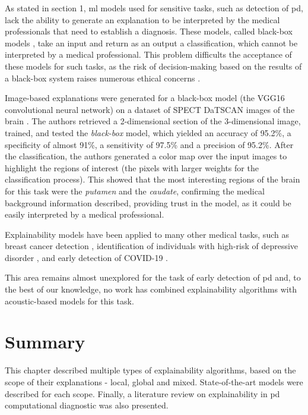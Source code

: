 As stated in section 1, \gls{ml} models used for sensitive tasks, such as detection of \gls{pd}, lack the ability to generate an explanation to be interpreted by the medical professionals that need to establish a diagnosis. These models, called black-box models \cite{explainable_ai_systems}, take an input and return as an output a classification, which cannot be interpreted by a medical professional. This problem difficults the acceptance of these models for such tasks, as the risk of decision-making based on the results of a black-box system raises numerous ethical concerns \cite{ethical_black_box_decision}.

Image-based explanations were generated for a black-box model (the VGG16 convolutional neural network) on a dataset of SPECT DaTSCAN images of the brain \cite{LIME_explainability}. The authors retrieved a 2-dimensional section of the 3-dimensional image, trained, and tested the \textit{black-box} model, which yielded an accuracy of 95.2\%, a specificity of almost 91\%, a sensitivity of 97.5\% and a precision of 95.2\%. After the classification, the authors generated a color map over the input images to highlight the regions of interest (the pixels with larger weights for the classification process). This showed that the most interesting regions of the brain for this task were the \textit{putamen} and the \textit{caudate}, confirming the medical background information described, providing trust in the model, as it could be easily interpreted by a medical professional.

Explainability models have been applied to many other medical tasks, such as breast cancer detection \cite{lime_breast_cancer}, identification of individuals with high-risk of depressive disorder \cite{lime_depression}, and early detection of COVID-19 \cite{lime_covid}. 

This area remains almost unexplored for the task of early detection of \gls{pd} and, to the best of our knowledge, no work has combined explainability algorithms with acoustic-based models for this task.

\section{Summary}

This chapter described multiple types of explainability algorithms, based on the scope of their explanations - local, global and mixed. State-of-the-art models were described for each scope. Finally, a literature review on explainability in \gls{pd} computational diagnostic was also presented.

